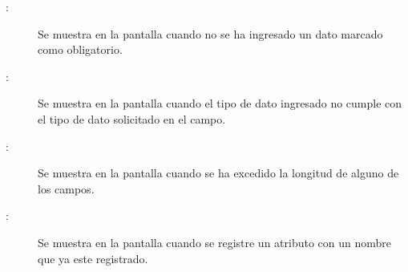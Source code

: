 	
\begin{description}
	\item[:] Se muestra en la pantalla  cuando no se ha ingresado un dato marcado como obligatorio.
	\item[:] Se muestra en la pantalla  cuando el tipo de dato ingresado no cumple con el tipo de dato solicitado en el campo.
	\item[:] Se muestra en la pantalla  cuando se ha excedido la longitud de alguno de los campos.
	\item[:] Se muestra en la pantalla  cuando se registre un atributo con un nombre que ya este registrado.
\end{description}
